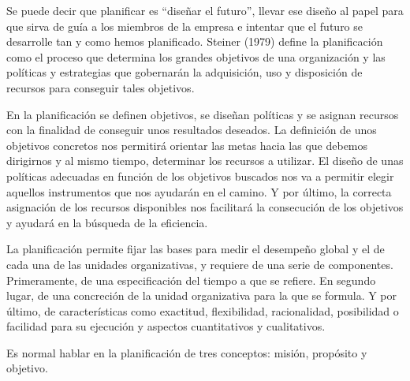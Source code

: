 \documentclass[
]{krantz}
\begin{document}
Se puede decir que planificar es ``diseñar el futuro'', llevar ese diseño al papel para que sirva de guía a los miembros de la empresa e intentar que el futuro se desarrolle tan y como hemos planificado. Steiner (1979) define la planificación como el proceso que determina los grandes objetivos de una organización y las políticas y estrategias que gobernarán la adquisición, uso y disposición de recursos para conseguir tales objetivos.

En la planificación se definen objetivos, se diseñan políticas y se asignan recursos con la finalidad de conseguir unos resultados deseados. La definición de unos objetivos concretos nos permitirá orientar las metas hacia las que debemos dirigirnos y al mismo tiempo, determinar los recursos a utilizar. El diseño de unas políticas adecuadas en función de los objetivos buscados nos va a permitir elegir aquellos instrumentos que nos ayudarán en el camino. Y por último, la correcta asignación de los recursos disponibles nos facilitará la consecución de los objetivos y ayudará en la búsqueda de la eficiencia.

La planificación permite fijar las bases para medir el desempeño global y el de cada una de las unidades organizativas, y requiere de una serie de componentes. Primeramente, de una especificación del tiempo a que se refiere. En segundo lugar, de una concreción de la unidad organizativa para la que se formula. Y por último, de características como exactitud, flexibilidad, racionalidad, posibilidad o facilidad para su ejecución y aspectos cuantitativos y cualitativos.

Es normal hablar en la planificación de tres conceptos: misión, propósito y objetivo.
\end{document}
